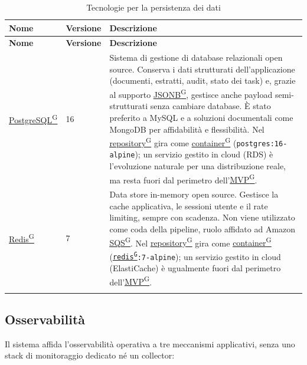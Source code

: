 \documentclass[a4paper,12pt]{article}
\providecommand{\glslink}[2]{\href{https://alittlebyte-19.github.io/Documentazione/glossario.html\#gls-#1}{\underline{#2}\textsuperscript{\scriptsize G}}}
\begin{document}
\renewcommand{\arraystretch}{1.3}
{\small
\setlength{\LTleft}{0pt}
\setlength{\LTright}{0pt}
\begin{longtable}{|p{3cm}|p{1.8cm}|p{9.7cm}|}
    \hline
    \rowcolor{gray!20}
    \textbf{Nome} & \textbf{Versione} & \textbf{Descrizione} \\
    \hline
    \endfirsthead
    \hline
    \rowcolor{gray!20}
    \textbf{Nome} & \textbf{Versione} & \textbf{Descrizione} \\
    \hline
    \endhead
    \glslink{postgresql}{PostgreSQL} & 16 & Sistema di gestione di database relazionali open source. Conserva i dati strutturati dell'applicazione (documenti, estratti, audit, stato dei task) e, grazie al supporto \glslink{jsonb}{JSONB}, gestisce anche payload semi-strutturati senza cambiare database. È stato preferito a MySQL e a soluzioni documentali come MongoDB per affidabilità e flessibilità. Nel \glslink{repository}{repository} gira come \glslink{container}{container} (\texttt{postgres:16-alpine}); un servizio gestito in cloud (RDS) è l'evoluzione naturale per una distribuzione reale, ma resta fuori dal perimetro dell'\glslink{mvp-minimum-viable-product}{MVP}. \\
    \hline
    \glslink{redis}{Redis} & 7 & Data store in-memory open source. Gestisce la cache applicativa, le sessioni utente e il rate limiting, sempre con scadenza. Non viene utilizzato come coda della pipeline, ruolo affidato ad Amazon \glslink{sqs-simple-queue-service}{SQS}. Nel \glslink{repository}{repository} gira come \glslink{container}{container} (\texttt{\glslink{redis}{redis}:7-alpine}); un servizio gestito in cloud (ElastiCache) è ugualmente fuori dal perimetro dell'\glslink{mvp-minimum-viable-product}{MVP}. \\
    \hline
    \caption{Tecnologie per la persistenza dei dati}
\end{longtable}
}

\subsection{Osservabilità}

Il sistema affida l'osservabilità operativa a tre meccanismi applicativi, senza uno stack di monitoraggio dedicato né un collector:
\end{document}
